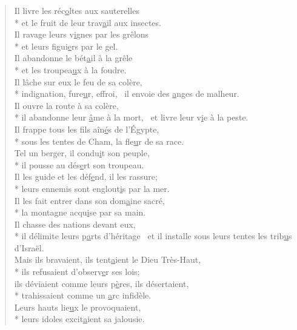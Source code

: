 \begin{verse}
Il livre les réc\underline{o}ltes aux sauterelles \\*
et le fruit de leur trav\underline{a}il aux insectes. \\
Il ravage leurs v\underline{i}gnes par les grêlons \\*
et leurs figui\underline{e}rs par le gel. \\

Il abandonne le bét\underline{a}il à la grêle \\*
et les troupea\underline{u}x à la foudre. \\
Il lâche sur eux le feu de sa colère, \\*
indignation, fure\underline{u}r, effroi,~\psalmstar
il envoie des \underline{a}nges de malheur. \\

Il ouvre la route à sa colère, \\*
il abandonne leur \underline{â}me à la mort,~\psalmstar
et livre leur v\underline{i}e à la peste. \\
Il frappe tous les fils aîn\underline{é}s de l’Égypte, \\*
sous les tentes de Cham, la fle\underline{u}r de sa race. \\

Tel un berger, il condu\underline{i}t son peuple, \\*
il pousse au dés\underline{e}rt son troupeau. \\
Il les guide et les déf\underline{e}nd, il les rassure; \\*
leurs ennemis sont englout\underline{i}s par la mer. \\

Il les fait entrer dans son dom\underline{a}ine sacré, \\*
la montagne acqu\underline{i}se par sa main. \\
Il chasse des nations devant eux, \\*
il délimite leurs p\underline{a}rts d’héritage~\psalmstar
et il installe sous leurs tentes les trib\underline{u}s d’Israël. \\

Mais ils bravaient, ils tent\underline{a}ient le Dieu Très-Haut, \\*
ils refusaient d’observ\underline{e}r ses lois; \\
ils déviaient comme leurs p\underline{è}res, ils désertaient, \\*
trahissaient comme un \underline{a}rc infidèle. \\
Leurs hauts lie\underline{u}x le provoquaient, \\*
leurs idoles excit\underline{a}ient sa jalousie. \\


\end{verse}
